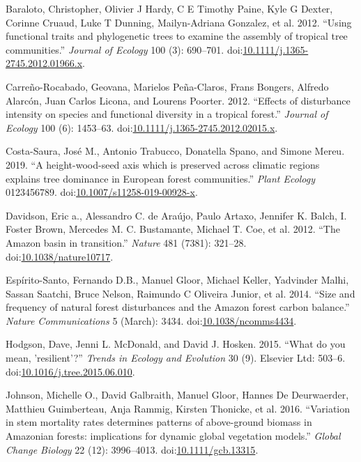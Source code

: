 \documentclass[]{elsarticle} %
\begin{document}
\hypertarget{ref-Baraloto2012a}{}
Baraloto, Christopher, Olivier J Hardy, C E Timothy Paine, Kyle G
Dexter, Corinne Cruaud, Luke T Dunning, Mailyn-Adriana Gonzalez, et al.
2012. ``Using functional traits and phylogenetic trees to examine the
assembly of tropical tree communities.'' \emph{Journal of Ecology} 100
(3): 690--701.
doi:\href{https://doi.org/10.1111/j.1365-2745.2012.01966.x}{10.1111/j.1365-2745.2012.01966.x}.

\hypertarget{ref-Carreno-Rocabado2012}{}
Carreño-Rocabado, Geovana, Marielos Peña-Claros, Frans Bongers, Alfredo
Alarcón, Juan Carlos Licona, and Lourens Poorter. 2012. ``Effects of
disturbance intensity on species and functional diversity in a tropical
forest.'' \emph{Journal of Ecology} 100 (6): 1453--63.
doi:\href{https://doi.org/10.1111/j.1365-2745.2012.02015.x}{10.1111/j.1365-2745.2012.02015.x}.

\hypertarget{ref-Costa-Saura2019}{}
Costa-Saura, José M., Antonio Trabucco, Donatella Spano, and Simone
Mereu. 2019. ``A height-wood-seed axis which is preserved across
climatic regions explains tree dominance in European forest
communities.'' \emph{Plant Ecology} 0123456789.
doi:\href{https://doi.org/10.1007/s11258-019-00928-x}{10.1007/s11258-019-00928-x}.

\hypertarget{ref-Davidson2012}{}
Davidson, Eric a., Alessandro C. de Araújo, Paulo Artaxo, Jennifer K.
Balch, I. Foster Brown, Mercedes M. C. Bustamante, Michael T. Coe, et
al. 2012. ``The Amazon basin in transition.'' \emph{Nature} 481 (7381):
321--28.
doi:\href{https://doi.org/10.1038/nature10717}{10.1038/nature10717}.

\hypertarget{ref-Espirito-Santo2014}{}
Espírito-Santo, Fernando D.B., Manuel Gloor, Michael Keller, Yadvinder
Malhi, Sassan Saatchi, Bruce Nelson, Raimundo C Oliveira Junior, et al.
2014. ``Size and frequency of natural forest disturbances and the Amazon
forest carbon balance.'' \emph{Nature Communications} 5 (March): 3434.
doi:\href{https://doi.org/10.1038/ncomms4434}{10.1038/ncomms4434}.

\hypertarget{ref-Hodgson2015}{}
Hodgson, Dave, Jenni L. McDonald, and David J. Hosken. 2015. ``What do
you mean, 'resilient'?'' \emph{Trends in Ecology and Evolution} 30 (9).
Elsevier Ltd: 503--6.
doi:\href{https://doi.org/10.1016/j.tree.2015.06.010}{10.1016/j.tree.2015.06.010}.

\hypertarget{ref-Johnson2016}{}
Johnson, Michelle O., David Galbraith, Manuel Gloor, Hannes De
Deurwaerder, Matthieu Guimberteau, Anja Rammig, Kirsten Thonicke, et al.
2016. ``Variation in stem mortality rates determines patterns of
above-ground biomass in Amazonian forests: implications for dynamic
global vegetation models.'' \emph{Global Change Biology} 22 (12):
3996--4013.
doi:\href{https://doi.org/10.1111/gcb.13315}{10.1111/gcb.13315}.
\end{document}
